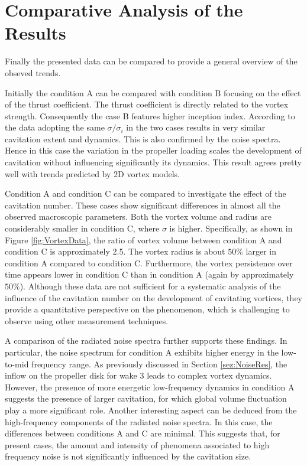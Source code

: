\section{Comparative Analysis of the Results}
\label{sez:Overview2}

Finally the presented data can be compared to provide a general overview of the obseved trends.

Initially the condition A can be compared with condition B focusing on the effect of the thrust coefficient. 
The thrust coefficient is directly related to the vortex strength. Consequently the case B features higher inception index. 
According to the data adopting the same $\sigma/\sigma_i$ in the two cases results in very similar cavitation extent and dynamics. This is also confirmed by the noise spectra. 
Hence in this case the variation in the propeller loading scales the development of cavitation without influencing significantly its dynamics. This result agrees pretty well with trends predicted by 2D vortex models. 

Condition A and condition C can be compared to investigate the effect of the cavitation number. These cases show significant differences in almost all the observed macroscopic parameters.
Both the vortex volume and radius are considerably smaller in condition C, where $\sigma$ is higher. Specifically, as shown in Figure \ref{fig:VortexData}, the ratio of vortex volume between condition A and condition C is approximately 2.5. The vortex radius is about $50 \%$ larger in condition A compared to condition C. Furthermore, the vortex persistence over time appears lower in condition C than in condition A (again by approximately $50 \%$).
Although these data are not sufficient for a systematic analysis of the influence of the cavitation number on the development of cavitating vortices, they provide a quantitative perspective on the phenomenon, which is challenging to observe using other measurement techniques.

A comparison of the radiated noise spectra further supports these findings. In particular, the noise spectrum for condition A exhibits higher energy in the low-to-mid frequency range. As previously discussed in Section \ref{sez:NoiseRes}, the inflow on the propeller disk for wake 3 leads to complex vortex dynamics. 
However, the presence of more energetic low-frequency dynamics in condition A suggests the presence of larger cavitation, for which global volume fluctuation play a more significant role.
Another interesting aspect can be deduced from the high-frequency components of the radiated noise spectra. In this case, the differences between conditions A and C are minimal. 
This suggests that, for present cases, the amount and intensity of phenomena associated to high frequency noise is not significantly influenced by the cavitation size.


